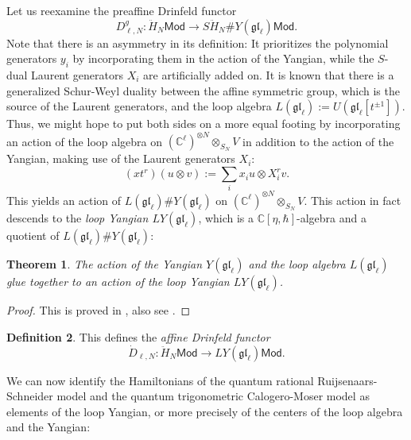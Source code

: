 \documentclass[11pt]{report}
\newtheorem{theorem}{Theorem}[section]
\theoremstyle{definition}
\newtheorem{definition}[theorem]{Definition}
\theoremstyle{remark}
\theoremstyle{remark}
\newcommand{\C}{\mathbb{C}}
\begin{document}
Let us reexamine the preaffine Drinfeld functor
\begin{equation*}
D_{\ell,N}^g: \ddot H_N\mathsf{Mod} \to S\ddot H_N \# Y(\mathfrak{gl}_\ell) \mathsf{Mod}.
\end{equation*}
Note that there is an asymmetry in its definition: It prioritizes the polynomial generators $y_i$ by incorporating them in the action of the Yangian, while the $S$-dual Laurent generators $X_i$ are artificially added on. It is known that there is a generalized Schur-Weyl duality between the affine symmetric group, which is the source of the Laurent generators, and the loop algebra $L(\mathfrak{gl}_\ell) := U(\mathfrak{gl}_\ell[t^{\pm 1}])$. Thus, we might hope to put both sides on a more equal footing by incorporating an action of the loop algebra on $(\C^\ell)^{\otimes N} \otimes_{S_N} V$ in addition to the action of the Yangian, making use of the Laurent generators $X_i$:
\begin{equation*}
(x t^r)(u \otimes v) := \sum_i x_i u \otimes X_i^r v.
\end{equation*}
This yields an action of $L(\mathfrak{gl}_\ell) \# Y(\mathfrak{gl}_\ell)$ on $(\C^\ell)^{\otimes N} \otimes_{S_N} V$. This action in fact descends to the \emph{loop Yangian $LY(\mathfrak{gl}_\ell)$}, which is a $\C[\eta,\hbar]$-algebra and a quotient of $L(\mathfrak{gl}_\ell) \# Y(\mathfrak{gl}_\ell)$:

\begin{theorem}
The action of the Yangian $Y(\mathfrak{gl}_\ell)$ and the loop algebra $L(\mathfrak{gl}_\ell)$ glue together to an action of the loop Yangian $LY(\mathfrak{gl}_\ell)$.
\end{theorem}

\begin{proof}
This is proved in \cite{article:guay:2005}, also see \cite{article:kodera:2016}.
\end{proof}

\begin{definition}
This defines the \emph{affine Drinfeld functor}
\begin{equation*}
\dot D_{\ell,N}: \ddot H_N\mathsf{Mod} \to LY(\mathfrak{gl}_\ell) \mathsf{Mod}.
\end{equation*}
\end{definition}

We can now identify the Hamiltonians of the quantum rational Ruijsenaars-Schneider model and the quantum trigonometric Calogero-Moser model as elements of the loop Yangian, or more precisely of the centers of the loop algebra and the Yangian:
\end{document}
